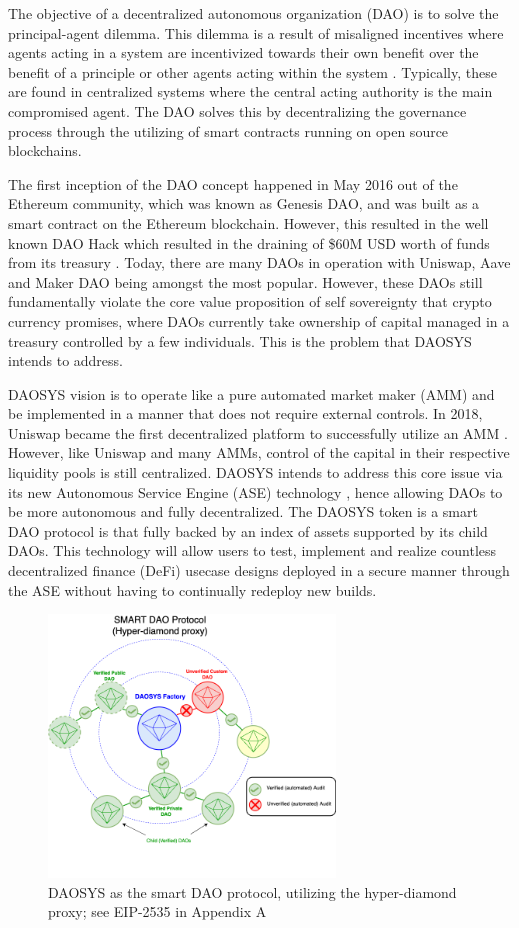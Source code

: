 \documentclass[journal,twocolumn,12pt]{ieeesyscoin}
\begin{document}
The objective of a decentralized autonomous organization (DAO) is to solve the principal-agent dilemma. This dilemma is a result of misaligned incentives where agents acting in a system are incentivized towards their own benefit over the benefit of a principle or other agents acting within the system \cite{San83}. Typically, these are found in centralized systems where the central acting authority is the main compromised agent. The DAO solves this by decentralizing the governance process through the utilizing of smart contracts running on open source blockchains.

The first inception of the DAO concept happened in May 2016 out of the Ethereum community, which was known as Genesis DAO, and was built as a smart contract on the Ethereum blockchain. However, this resulted in the well known DAO Hack which resulted in the draining of \$60M USD worth of funds from its treasury \cite{Sie22}. Today, there are many DAOs in operation with Uniswap, Aave and Maker DAO being amongst the most popular. However, these DAOs still fundamentally violate the core value proposition of self sovereignty that crypto currency promises, where DAOs currently take ownership of capital managed in a treasury controlled by a few individuals. This is the problem that DAOSYS intends to address.

DAOSYS vision is to operate like a pure automated market maker (AMM) and be implemented in a manner that does not require external controls. In 2018, Uniswap became the first decentralized platform to successfully utilize an AMM \cite{Uni19}. However, like Uniswap and many AMMs, control of the capital in their respective liquidity pools is still centralized. DAOSYS intends to address this core issue via its new Autonomous Service Engine (ASE) technology \cite{Sys22}, hence allowing DAOs to be more autonomous and fully decentralized. The DAOSYS token is a smart DAO protocol is that fully backed by an index of assets supported by its child DAOs. This technology will allow users to test, implement and realize countless decentralized finance (DeFi) usecase designs deployed in a secure manner through the ASE without having to continually redeploy new builds.

\begin{figure}[h!]
\includegraphics[width=3in]{img/smart_dao.png}
\caption{DAOSYS as the smart DAO protocol, utilizing the hyper-diamond proxy; see EIP-2535 in Appendix A} 
\label{fig:daosys_protocol}
\end{figure}
\end{document}
